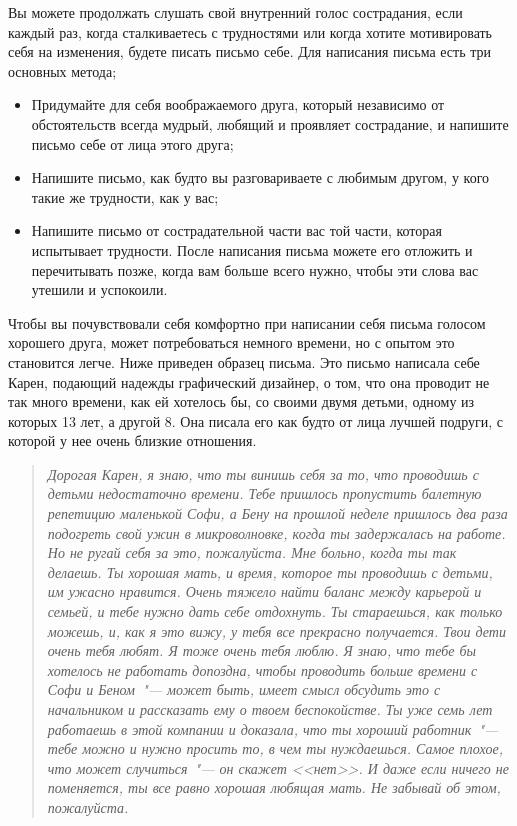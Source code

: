 Вы можете продолжать слушать свой внутренний голос сострадания, если каждый раз, когда сталкиваетесь с трудностями или когда хотите мотивировать себя на изменения, будете писать письмо себе. Для написания письма есть три основных метода;

\begin{itemize}
	\item Придумайте для себя воображаемого друга, который независимо от обстоятельств всегда мудрый, любящий и проявляет сострадание, и напишите письмо себе от лица этого друга;
	\item Напишите письмо, как будто вы разговариваете с любимым другом, у кого такие же трудности, как у вас;
	\item Напишите письмо от сострадательной части вас той части, которая испытывает трудности.
	После написания письма можете его отложить и перечитывать позже, когда вам больше всего нужно, чтобы эти слова вас утешили и успокоили. 
\end{itemize}

Чтобы вы почувствовали себя комфортно при написании себя письма голосом хорошего друга, может потребоваться немного времени, но с опытом это становится легче. Ниже приведен образец письма. Это письмо написала себе Карен, подающий надежды графический дизайнер, о том, что она проводит не так много времени, как ей хотелось бы, со своими двумя детьми, одному из которых 13 лет, а другой 8. Она писала его как будто от лица лучшей подруги, с которой у нее очень близкие отношения.

\begin{quotation}
	\textit{Дорогая Карен, я знаю, что ты винишь себя за то, что проводишь с детьми недостаточно времени. Тебе пришлось пропустить балетную репетицию маленькой Софи, а Бену на прошлой неделе пришлось два раза подогреть свой ужин в микроволновке, когда ты задержалась на работе. Но не ругай себя за это, пожалуйста. Мне больно, когда ты так делаешь. Ты хорошая мать, и время, которое ты проводишь с детьми, им ужасно нравится. Очень тяжело найти баланс между карьерой и семьей, и тебе нужно дать себе отдохнуть. Ты стараешься, как только можешь, и, как я это вижу, у тебя все прекрасно получается. Твои дети очень тебя любят. Я тоже очень тебя люблю. Я знаю, что тебе бы хотелось не работать допоздна, чтобы проводить больше времени с Софи и Беном~"--- может быть, имеет смысл обсудить это с начальником и рассказать ему о твоем беспокойстве. Ты уже семь лет работаешь в этой компании и доказала, что ты хороший работник~"--- тебе можно и нужно просить то, в чем ты нуждаешься. Самое плохое, что может случиться~"--- он скажет <<нет>>. И даже если ничего не поменяется, ты все равно хорошая любящая мать. Не забывай об этом, пожалуйста.}
\end{quotation}
